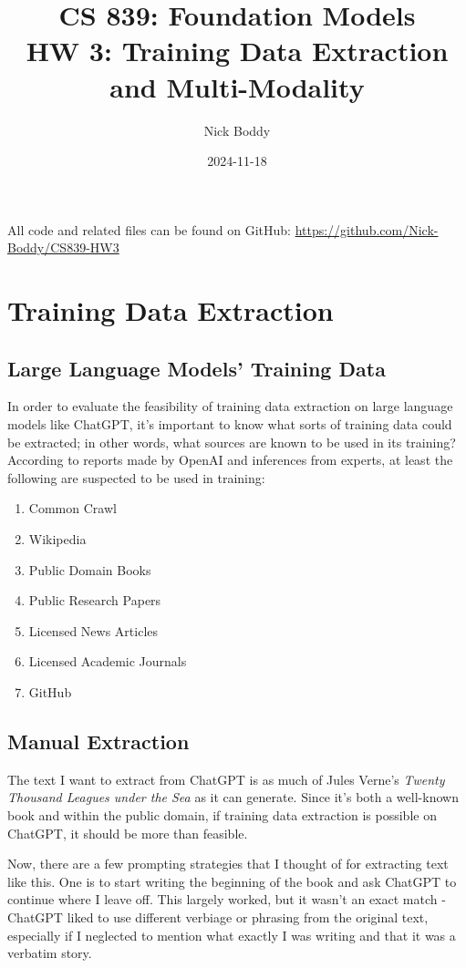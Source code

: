 \documentclass{article}
\title{CS 839: Foundation Models \\ HW 3: Training Data Extraction and Multi-Modality}
\author{Nick Boddy}
\date{2024-11-18}
\begin{document}
	
	\maketitle
	
	All code and related files can be found on GitHub:
	\url{https://github.com/Nick-Boddy/CS839-HW3}
	
	\section{Training Data Extraction}
	
	\subsection{Large Language Models' Training Data}
	In order to evaluate the feasibility of training data extraction on large language models like ChatGPT, it's important to know what sorts of training data could be extracted; in other words, what sources are known to be used in its training? According to reports made by OpenAI and inferences from experts, at least the following are suspected to be used in training:
	
	\begin{enumerate}
		\item Common Crawl
		\item Wikipedia
		\item Public Domain Books
		\item Public Research Papers
		\item Licensed News Articles
		\item Licensed Academic Journals
		\item GitHub
	\end{enumerate}
	
	\subsection{Manual Extraction}
	The text I want to extract from ChatGPT is as much of Jules Verne's \textit{Twenty Thousand Leagues under the Sea} as it can generate. Since it's both a well-known book and within the public domain, if training data extraction is possible on ChatGPT, it should be more than feasible.
	
	Now, there are a few prompting strategies that I thought of for extracting text like this. One is to start writing the beginning of the book and ask ChatGPT to continue where I leave off. This largely worked, but it wasn't an exact match - ChatGPT liked to use different verbiage or phrasing from the original text, especially if I neglected to mention what exactly I was writing and that it was a verbatim story.
	
\end{document}
